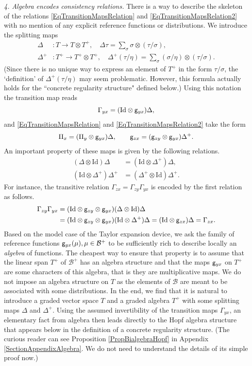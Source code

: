 \documentclass[10pt, reqno]{amsart}
\numberwithin{subsection}{section}
\numberwithin{subsubsection}{subsection}
\numberwithin{equation}{section} %
\theoremstyle{mystyle}
\theoremstyle{mystyle2}
\theoremstyle{mystyle3}
\newcommand{\iden}{\text{\rm Id}}
\newcommand{\mcB}{\mathcal{B}}
\begin{document}
{\it 4. Algebra encodes consistency relations.} There is a way to describe the skeleton of the relations \eqref{EqTransitionMapsRelation} and \eqref{EqTransitionMapsRelation2} with no mention of any explicit reference functions or distributions. We introduce the splitting maps 
\begin{align*}
\Delta &: T\rightarrow T\otimes T^+, \quad \Delta\tau = \sum_{\sigma} \sigma\otimes (\tau/\sigma),\\
\Delta^+ &: T^+\rightarrow T^+\otimes T^+,\quad \Delta^+(\tau/\eta) = \sum_{\sigma} (\sigma/\eta)\otimes (\tau/\sigma).
\end{align*}
(Since there is no unique way to express an element of $T^+$ in the form $\tau/\sigma$, the `definition' of $\Delta^+(\tau/\eta)$ may seem problematic. However, this formula actually holds for the ``concrete regularity structure" defined below.) Using this notation the transition map reads
$$
\Gamma_{yx}=(\iden\otimes{\sf g}_{yx})\Delta,
$$
and \eqref{EqTransitionMapsRelation} and \eqref{EqTransitionMapsRelation2} take the form
$$
\Pi_x=(\Pi_y\otimes{\sf g}_{yx})\Delta,\qquad
{\sf g}_{zx}=({\sf g}_{zy}\otimes{\sf g}_{yx})\Delta^+.
$$
An important property of these maps is given by the following relations.
\begin{equation}\label{EqRightComodule}   
\begin{split}
(\Delta\otimes \textrm{Id})\Delta &= (\textrm{Id}\otimes \Delta^+)\Delta,\\
(\textrm{Id}\otimes \Delta^+)\Delta^+ &= (\Delta^+\otimes \textrm{Id})\Delta^+.
\end{split}
\end{equation}
For instance, the transitive relation $\Gamma_{zx}=\Gamma_{zy}\Gamma_{yx}$ is encoded by the first relation as follows.
\begin{align*}
\Gamma_{zy}\Gamma_{yx}&=(\iden\otimes{\sf g}_{zy}\otimes{\sf g}_{yx})(\Delta\otimes\iden)\Delta\\
&=(\iden\otimes{\sf g}_{zy}\otimes{\sf g}_{yx})(\iden\otimes\Delta^+)\Delta=(\iden\otimes{\sf g}_{zx})\Delta
=\Gamma_{zx}.
\end{align*}   
Based on the model case of the Taylor expansion device, we ask the family of reference functions ${\sf g}_{yx}(\mu), \mu\in\mcB^+$ to be sufficiently rich to describe locally an \textit{algebra} of functions. The cheapest way to ensure that property is to assume that the linear span $T^+$ of $\mcB^+$ has an algebra structure and that the maps ${\sf g}_{yx}$ on $T^+$ are some characters of this algebra, that is they are multiplicative maps. We do not impose an algebra structure on $T$ as the elements of $\mcB$ are meant to be associated with some distributions. In the end, we find that it is natural to introduce a graded vector space $T$ and a graded algebra $T^+$ with some splitting maps $\Delta$ and $\Delta^{+}$. Using the assumed invertibility of the transition maps $\Gamma_{yx}$, an elementary fact from algebra then leads directly to the Hopf algebra structure that appears below in the definition of a concrete regularity structure. (The curious reader can see Proposition \ref{PropBialgebraHopf} in Appendix {\sf \ref{SectionAppendixAlgebra}}. We do not need to understand the details of its simple proof now.)
\end{document}
